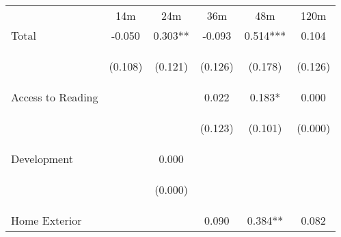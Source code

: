 \begin{tabular}{lccccc}
\hline \noalign{\smallskip} & 14m & 24m & 36m & 48m & 120m\\
\noalign{\smallskip}\hline \noalign{\smallskip}Total & -0.050 & 0.303** & -0.093 & 0.514*** & 0.104\\
 & \begin{footnotesize}(0.108)\end{footnotesize} & \begin{footnotesize}(0.121)\end{footnotesize} & \begin{footnotesize}(0.126)\end{footnotesize} & \begin{footnotesize}(0.178)\end{footnotesize} & \begin{footnotesize}(0.126)\end{footnotesize}\\
\noalign{\smallskip}Access to Reading &  &  & 0.022 & 0.183* & 0.000\\
 & \begin{footnotesize}\end{footnotesize} & \begin{footnotesize}\end{footnotesize} & \begin{footnotesize}(0.123)\end{footnotesize} & \begin{footnotesize}(0.101)\end{footnotesize} & \begin{footnotesize}(0.000)\end{footnotesize}\\
\noalign{\smallskip}Development &  & 0.000 &  &  & \\
 & \begin{footnotesize}\end{footnotesize} & \begin{footnotesize}(0.000)\end{footnotesize} & \begin{footnotesize}\end{footnotesize} & \begin{footnotesize}\end{footnotesize} & \begin{footnotesize}\end{footnotesize}\\
\noalign{\smallskip}Home Exterior &  &  & 0.090 & 0.384** & 0.082\\

\end{tabular}
